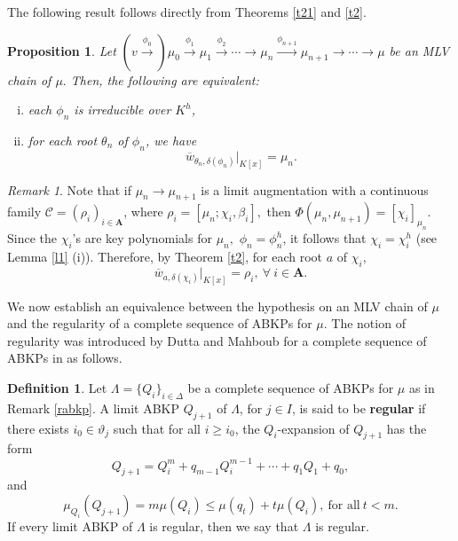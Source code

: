 \documentclass[11pt]{amsart}
\newtheorem{proposition}[theorem]{Proposition}
\theoremstyle{definition}
\newtheorem{definition}[theorem]{Definition}
\theoremstyle{remark}
\newtheorem{remark}[theorem]{Remark}
\numberwithin{equation}{section}
\begin{document}
		 The  following result follows directly from Theorems \ref{t21} and \ref{t2}.
		\begin{proposition}\label{pc}
		Let $(v\xrightarrow{\phi_0})\mu_0\xrightarrow{\phi_1} \mu_1\xrightarrow{\phi_2}\cdots \longrightarrow \mu_{n}\xrightarrow{\phi_{n+1}} \mu_{n+1}\longrightarrow\cdots\longrightarrow \mu$ be an MLV chain of $\mu.$ Then, the following are equivalent:
		\begin{enumerate}[(i)]
			\item each $\phi_n$ is irreducible over $K^h$,
			\item for each root $\theta_n$ of $\phi_n$, we have \[\overline{w}_{\theta_n,\delta(\phi_n)}|_{K[x]}=\mu_n.\]
		\end{enumerate}
		\end{proposition}
		
		\begin{remark}\label{rc}
		Note that if $\mu_n\longrightarrow \mu_{n+1}$ is a limit augmentation with a continuous family $\mathcal{C}=(\rho_i)_{i\in\mathbf{A}}$, where $\rho_i=[\mu_n;\chi_i,\beta_i],$ then $\Phi(\mu_n,\mu_{n+1})=[\chi_i]_{\mu_n}$. Since the $\chi_i$'s are key polynomials for $\mu_n,$ $\phi_n=\phi_n^h$, it follows that $\chi_i=\chi_i^h$ (see Lemma \ref{l1} (i)). Therefore, by Theorem \ref{t2}, for each root $a$ of $\chi_i$, \[\overline{w}_{a,\delta(\chi_i)}|_{K[x]}=\rho_i,\ \forall \ i\in\mathbf{A}.\]	
		\end{remark} 
		
	We now establish an equivalence between the hypothesis on an MLV chain of $\mu$ and the regularity of a complete sequence of ABKPs for $\mu$. The notion of regularity was introduced by Dutta and Mahboub for a complete sequence of ABKPs in \cite{AM}  as follows. 
		 
		
			\begin{definition}
			Let $\Lambda=\{Q_i\}_{i\in\Delta}$ be a complete sequence of ABKPs for $\mu$ as in Remark \ref{rabkp}. A limit ABKP $Q_{j+1}$ of $\Lambda$, for $j\in I$, is said to be {\bf regular} if there exists $i_0\in\vartheta_{j}$ such that for all $i\geq i_0$, the $Q_i$-expansion of $Q_{j+1}$ has the form
			\[Q_{j+1}=Q_i^{m}+q_{m-1}Q_i^{m-1}+\cdots+q_1Q_1+q_0,\] and
			\[\mu_{Q_i}(Q_{j+1})=m\mu(Q_i)\leq \mu(q_t)+t\mu(Q_i),\ \text{for all}\ t<m.\] If every limit ABKP of $\Lambda$ is regular, then we say that $\Lambda$ is regular.
		\end{definition}
		
\end{document}
